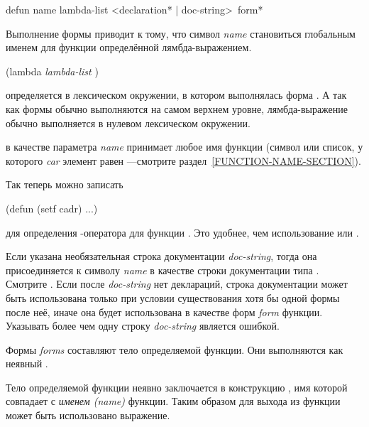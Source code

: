 \begin{defmac}
defun name lambda-list <{declaration}* | doc-string> {\,form}*

Выполнение формы  приводит к тому, что символ \emph{name}
становиться глобальным именем для функции определённой лямбда-выражением.
\begin{lisp}
(lambda \emph{lambda-list}  )
\end{lisp}
определяется в лексическом окружении, в котором выполнялась форма
. А так как формы  обычно выполняются на самом верхнем
уровне, лямбда-выражение обычно выполняется в нулевом лексическом окружении.


 в качестве параметра \emph{name} принимает любое имя функции (символ
или список, у которого \emph{car} элемент равен ---смотрите
раздел~\ref{FUNCTION-NAME-SECTION}).

Так теперь можно записать
\begin{lisp}
(defun (setf cadr) ...)
\end{lisp}
для определения -оператора для функции . Это удобнее,
чем использование  или .

Если указана необязательная строка документации \emph{doc-string}, тогда она
присоединяется к символу \emph{name} в качестве строки документации типа
. Смотрите . Если после \emph{doc-string} нет
деклараций, строка документации может быть использована только при условии
существования хотя бы одной формы после неё, иначе она будет использована в
качестве форм \emph{form} функции. Указывать более чем одну строку
\emph{doc-string} является ошибкой.

Формы \emph{forms} составляют тело определяемой функции. Они выполняются как
неявный .

Тело определяемой функции неявно заключается в конструкцию , имя
которой совпадает с \emph{именем (name)} функции. Таким образом для выхода из функции
может быть использовано выражение.


\end{defmac}
